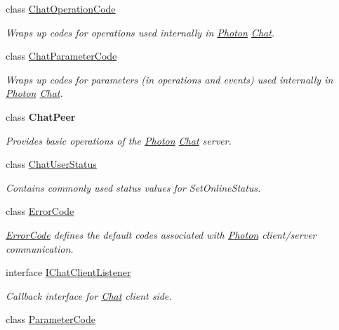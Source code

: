 \begin{DoxyCompactItemize}
class \hyperlink{class_exit_games_1_1_client_1_1_photon_1_1_chat_1_1_chat_operation_code}{Chat\+Operation\+Code}
\begin{DoxyCompactList}\small\item\em Wraps up codes for operations used internally in \hyperlink{namespace_exit_games_1_1_client_1_1_photon}{Photon} \hyperlink{namespace_exit_games_1_1_client_1_1_photon_1_1_chat}{Chat}. \end{DoxyCompactList}\item 
class \hyperlink{class_exit_games_1_1_client_1_1_photon_1_1_chat_1_1_chat_parameter_code}{Chat\+Parameter\+Code}
\begin{DoxyCompactList}\small\item\em Wraps up codes for parameters (in operations and events) used internally in \hyperlink{namespace_exit_games_1_1_client_1_1_photon}{Photon} \hyperlink{namespace_exit_games_1_1_client_1_1_photon_1_1_chat}{Chat}. \end{DoxyCompactList}\item 
class {\bfseries Chat\+Peer}
\begin{DoxyCompactList}\small\item\em Provides basic operations of the \hyperlink{namespace_exit_games_1_1_client_1_1_photon}{Photon} \hyperlink{namespace_exit_games_1_1_client_1_1_photon_1_1_chat}{Chat} server. \end{DoxyCompactList}\item 
class \hyperlink{class_exit_games_1_1_client_1_1_photon_1_1_chat_1_1_chat_user_status}{Chat\+User\+Status}
\begin{DoxyCompactList}\small\item\em Contains commonly used status values for Set\+Online\+Status. \end{DoxyCompactList}\item 
class \hyperlink{class_exit_games_1_1_client_1_1_photon_1_1_chat_1_1_error_code}{Error\+Code}
\begin{DoxyCompactList}\small\item\em \hyperlink{class_exit_games_1_1_client_1_1_photon_1_1_chat_1_1_error_code}{Error\+Code} defines the default codes associated with \hyperlink{namespace_exit_games_1_1_client_1_1_photon}{Photon} client/server communication. \end{DoxyCompactList}\item 
interface \hyperlink{interface_exit_games_1_1_client_1_1_photon_1_1_chat_1_1_i_chat_client_listener}{I\+Chat\+Client\+Listener}
\begin{DoxyCompactList}\small\item\em Callback interface for \hyperlink{namespace_exit_games_1_1_client_1_1_photon_1_1_chat}{Chat} client side. \end{DoxyCompactList}\item 
class \hyperlink{class_exit_games_1_1_client_1_1_photon_1_1_chat_1_1_parameter_code}{Parameter\+Code}
\end{DoxyCompactItemize}
